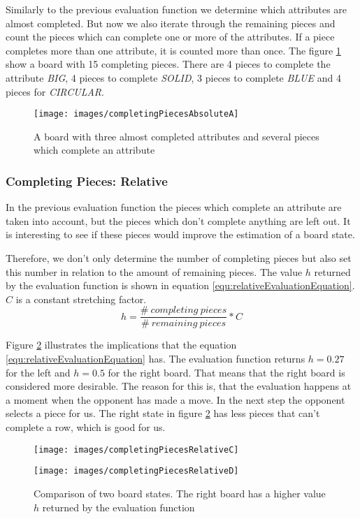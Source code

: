 Similarly to the previous evaluation function we determine which attributes are almost completed. But now we also iterate through the remaining pieces and count the pieces which can complete one or more of the attributes. If a piece completes more than one attribute, it is counted more than once. The figure \ref{fig:completingPiecesAbsoluteA} show a board with 15 completing pieces. There are 4 pieces to complete the attribute \emph{BIG}, 4 pieces to complete \emph{SOLID}, 3 pieces to complete \emph{BLUE} and 4 pieces for \emph{CIRCULAR}.
\begin{figure}[h]
  \centering
  \texttt{[image: images/completingPiecesAbsoluteA]}
  \caption{A board with three almost completed attributes and several pieces which complete an attribute}
  \label{fig:completingPiecesAbsoluteA}
\end{figure}
\subsubsection*{Completing Pieces: Relative}
In the previous evaluation function the pieces which complete an attribute are taken into account, but the pieces which don't complete anything are left out. It is interesting to see if these pieces would improve the estimation of a board state.

Therefore, we don't only determine the number of completing pieces but also set this number in relation to the amount of remaining pieces. The value $h$ returned by the evaluation function is shown in equation \ref{equ:relativeEvaluationEquation}. $C$ is a constant stretching factor.
\begin{equation}
	\label{equ:relativeEvaluationEquation}
	h=\frac{\#~completing~pieces}{\#~remaining~pieces}*C
\end{equation}

Figure \ref{fig:relativeComparison} illustrates the implications that the equation \ref{equ:relativeEvaluationEquation} has. The evaluation function returns $h = 0.27$ for the left and $h = 0.5$ for the right board. That means that the right board is considered more desirable. The reason for this is, that the evaluation happens at a moment when the opponent has made a move. In the next step the opponent selects a piece for us. The right state in figure \ref{fig:relativeComparison} has less pieces that can't complete a row, which is good for us. 
\begin{figure}[h]
  \hspace*{-7mm}
  \begin{minipage}[b]{0.5\linewidth}
    \centering
    \texttt{[image: images/completingPiecesRelativeC]}
  \end{minipage}
  \hspace{10mm}
  \begin{minipage}[b]{0.5\linewidth}
    \centering
    \texttt{[image: images/completingPiecesRelativeD]}    
  \end{minipage}
  \caption{Comparison of two board states. The right board has a higher value $h$ returned by the evaluation function}
  \label{fig:relativeComparison}
\end{figure}
